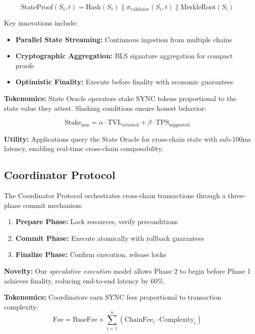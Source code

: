 \documentclass[12pt,a4paper]{article}
\begin{document}
\begin{equation}
\text{StateProof}(S_i, t) = \text{Hash}(S_i) \parallel \sigma_{\text{validator}}(S_i, t) \parallel \text{MerkleRoot}(S_i)
\end{equation}

Key innovations include:
\begin{itemize}
    \item \textbf{Parallel State Streaming:} Continuous ingestion from multiple chains
    \item \textbf{Cryptographic Aggregation:} BLS signature aggregation for compact proofs
    \item \textbf{Optimistic Finality:} Execute before finality with economic guarantees
\end{itemize}

\textbf{Tokenomics:} State Oracle operators stake SYNC tokens proportional to the state value they attest. Slashing conditions ensure honest behavior:

\begin{equation}
\text{Stake}_{\text{min}} = \alpha \cdot \text{TVL}_{\text{attested}} + \beta \cdot \text{TPS}_{\text{supported}}
\end{equation}

\textbf{Utility:} Applications query the State Oracle for cross-chain state with sub-100ms latency, enabling real-time cross-chain composability.

\subsection{Coordinator Protocol}

The Coordinator Protocol orchestrates cross-chain transactions through a three-phase commit mechanism:

\begin{enumerate}
    \item \textbf{Prepare Phase:} Lock resources, verify preconditions
    \item \textbf{Commit Phase:} Execute atomically with rollback guarantees
    \item \textbf{Finalize Phase:} Confirm execution, release locks
\end{enumerate}

\textbf{Novelty:} Our \textit{speculative execution} model allows Phase 2 to begin before Phase 1 achieves finality, reducing end-to-end latency by 60\%.

\textbf{Tokenomics:} Coordinators earn SYNC fees proportional to transaction complexity:
\begin{equation}
\text{Fee} = \text{BaseFee} + \sum_{i=1}^{n} (\text{ChainFee}_i \cdot \text{Complexity}_i)
\end{equation}
\end{document}
